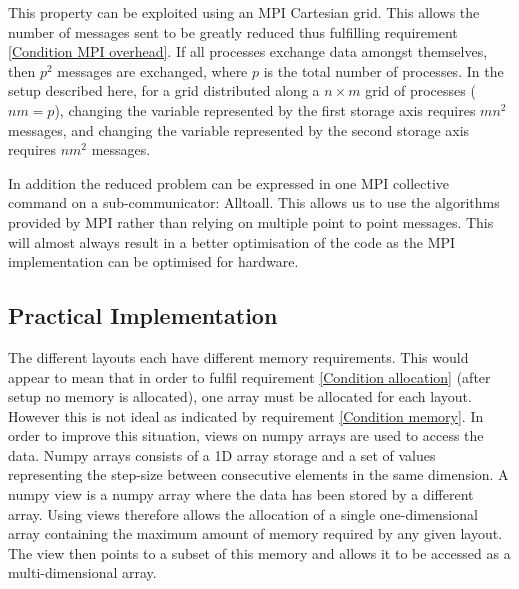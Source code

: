 This property can be exploited using an MPI Cartesian grid. This allows the number of messages sent to be greatly reduced thus fulfilling requirement \ref{Condition MPI overhead}. If all processes exchange data amongst themselves, then $p^2$ messages are exchanged,  where $p$ is the total number of processes. In the setup described here, for a grid distributed along a $n \times m$ grid of processes ($nm=p$), changing the variable represented by the first storage axis requires $m n^2$ messages, and changing the variable represented by the second storage axis requires $n m^2$ messages.

In addition the reduced problem can be expressed in one MPI collective command on a sub-communicator: Alltoall. This allows us to use the algorithms provided by MPI rather than relying on multiple point to point messages. This will almost always result in a better optimisation of the code as the MPI implementation can be optimised for hardware.

\subsection{Practical Implementation}

The different layouts each have different memory requirements. This would appear to mean that in order to fulfil requirement \ref{Condition allocation} (after setup no memory is allocated), one array must be allocated for each layout. However this is not ideal as indicated by requirement \ref{Condition memory}. In order to improve this situation, views on numpy arrays are used to access the data. Numpy arrays consists of a 1D array storage and a set of values representing the step-size between consecutive elements in the same dimension. A numpy view is a numpy array where the data has been stored by a different array. Using views therefore allows the allocation of a single one-dimensional array containing the maximum amount of memory required by any given layout. The view then points to a subset of this memory and allows it to be accessed as a multi-dimensional array.

